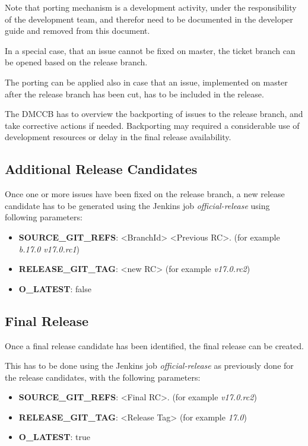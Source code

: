 Note that porting mechanism is a development activity, under the responsibility of the development team, and therefor need to be documented in the developer guide and removed from this document.

In a special case, that an issue cannot be fixed on master, the ticket branch can be opened based on the release branch.

The porting can be applied also in case that an issue, implemented on master after the release branch has been cut, has to be included in the release.

The DMCCB has to overview the backporting of issues to the release branch, and take corrective actions if needed. Backporting may required a considerable use of development resources or delay in the final release availability.


\subsection{Additional Release Candidates} \label{sect:newrc}

Once one or more issues have been fixed on the release branch, a new release candidate has to be generated using the Jenkins job \textit{official-release} using following parameters:

\begin{itemize}
\item {\bf SOURCE\_GIT\_REFS}: <BranchId> <Previous RC>. (for example \textit{b.17.0 v17.0.rc1})
\item {\bf RELEASE\_GIT\_TAG}: <new RC> (for example \textit{v17.0.rc2})
\item {\bf O\_LATEST}: false
\end{itemize}

\subsection{Final Release} \label{sect:finalrelease}

Once a final release candidate has been identified, the final release can be created.

This has to be done using the Jenkins job \textit{official-release} as previously done for the release candidates, with the following parameters:

\begin{itemize}
\item {\bf SOURCE\_GIT\_REFS}: <Final RC>. (for example \textit{v17.0.rc2})
\item {\bf RELEASE\_GIT\_TAG}: <Release Tag> (for example \textit{17.0})
\item {\bf O\_LATEST}: true
\end{itemize}

